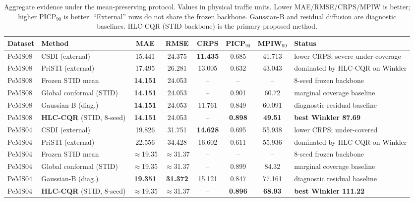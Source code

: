 \documentclass[letterpaper,journal]{IEEEtran}
\begin{document}
\begin{table}[t]
\centering
\caption{Aggregate evidence under the mean-preserving protocol.
Values in physical traffic units.  Lower MAE/RMSE/CRPS/MPIW is better;
higher PICP$_{90}$ is better.  ``External'' rows do not share the frozen backbone.
Gaussian-B and residual diffusion are diagnostic baselines.
HLC-CQR (STID backbone) is the primary proposed method.}
\label{tab:trusted_main}
\scriptsize
\setlength{\tabcolsep}{2pt}
\begin{tabular}{@{}llcccccl@{}}
\toprule
Dataset & Method & MAE & RMSE & CRPS & PICP$_{90}$ & MPIW$_{90}$ & Status \\
\midrule
PeMS08 & CSDI (external) & 15.441 & 24.375 & \textbf{11.435} & 0.685 & 41.713 & lower CRPS; severe under-coverage \\
PeMS08 & PriSTI (external) & 17.495 & 26.281 & 13.005 & 0.632 & 43.043 & dominated by HLC-CQR on Winkler \\
PeMS08 & Frozen STID mean & \textbf{14.151} & 24.053 & -- & -- & -- & 8-seed frozen backbone \\
PeMS08 & Global conformal (STID) & \textbf{14.151} & 24.053 & -- & 0.901 & 60.72 & marginal coverage baseline \\
PeMS08 & Gaussian-B (diag.) & \textbf{14.151} & 24.053 & 11.761 & 0.849 & 60.091 & diagnostic residual baseline \\
PeMS08 & \textbf{HLC-CQR} (STID, 8-seed) & \textbf{14.151} & 24.053 & -- & \textbf{0.898} & \textbf{49.51} & \textbf{best Winkler 87.69} \\
\midrule
PeMS04 & CSDI (external) & 19.826 & 31.751 & \textbf{14.628} & 0.695 & 55.938 & lower CRPS; under-covered \\
PeMS04 & PriSTI (external) & 22.556 & 34.428 & 16.602 & 0.611 & 55.936 & dominated by HLC-CQR on Winkler \\
PeMS04 & Frozen STID mean & $\approx$19.35 & $\approx$31.37 & -- & -- & -- & 8-seed frozen backbone \\
PeMS04 & Global conformal (STID) & $\approx$19.35 & $\approx$31.37 & -- & 0.899 & 84.32 & marginal coverage baseline \\
PeMS04 & Gaussian-B (diag.) & \textbf{19.351} & \textbf{31.372} & 15.121 & 0.847 & 77.161 & diagnostic residual baseline \\
PeMS04 & \textbf{HLC-CQR} (STID, 8-seed) & $\approx$19.35 & $\approx$31.37 & -- & \textbf{0.896} & \textbf{68.93} & \textbf{best Winkler 111.22} \\
\bottomrule
\end{tabular}
\end{table}
\end{document}
